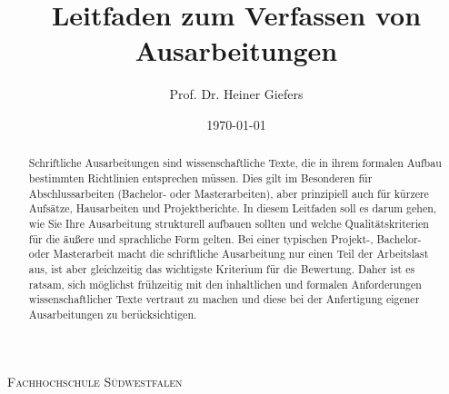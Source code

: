 \documentclass[pdftex,a4paper,abstracton,11pt,parskip=half,bibtotocnumbered]{scrartcl}
\title{Leitfaden zum Verfassen von Ausarbeitungen}
\author{Prof. Dr. Heiner Giefers}
\date{\today}
\begin{document}
\makeatletter
\begin{titlepage}
	\centering
	{\scshape\LARGE Fachhochschule Südwestfalen \par}
	\vspace{1cm}
	\vspace{1.5cm}
	{\huge\bfseries \@title\par}
	\vspace{3cm}
	{\Large \@author\par}
	\vspace{1cm}
	{\Large \@date\par}
	\vfill

	\raggedright
\end{titlepage}
\makeatother

\thispagestyle{empty}
\begin{abstract}
Schriftliche Ausarbeitungen sind  wissenschaftliche Texte, die in ihrem formalen Aufbau bestimmten Richtlinien entsprechen müssen.
Dies gilt im Besonderen für Abschlussarbeiten (Bachelor- oder Masterarbeiten), aber prinzipiell auch für kürzere Aufsätze, Hausarbeiten und Projektberichte.
In diesem Leitfaden soll es darum gehen, wie Sie Ihre Ausarbeitung strukturell aufbauen sollten und welche Qualitätskriterien für die äußere und sprachliche Form gelten.
Bei einer typischen Projekt-, Bachelor- oder Masterarbeit macht die schriftliche Ausarbeitung nur einen Teil der Arbeitslast aus, ist aber gleichzeitig das wichtigste Kriterium für die Bewertung.
Daher ist es ratsam, sich möglichst frühzeitig mit den inhaltlichen und formalen Anforderungen wissenschaftlicher Texte vertraut zu machen und diese bei der Anfertigung eigener Ausarbeitungen zu berücksichtigen.
\end{abstract}

\vfill
\tableofcontents
\pagebreak

\setcounter{page}{1}


%

\printbibliography
\end{document}
